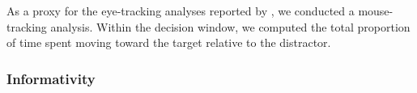 \documentclass[manuscript]{stjour}
\begin{document}
As a proxy for the eye-tracking analyses reported by \cite{KeysarLinBarr03_LimitsOnTheoryOfMindUse}, we conducted a mouse-tracking analysis. %
Within the decision window, we computed the total proportion of time spent moving toward the target relative to the distractor. %


\subsubsection{Informativity}
\end{document}
